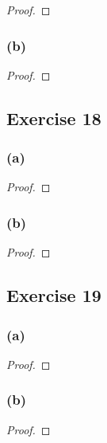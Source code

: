\documentclass[14pt]{extarticle}
\begin{document}
\begin{proof}

\end{proof}

\subsubsection{(b)}

\begin{proof}

\end{proof}

\subsection{Exercise 18}

\subsubsection{(a)}

\begin{proof}

\end{proof}

\subsubsection{(b)}

\begin{proof}

\end{proof}

\subsection{Exercise 19}

\subsubsection{(a)}

\begin{proof}

\end{proof}

\subsubsection{(b)}

\begin{proof}

\end{proof}
\end{document}

